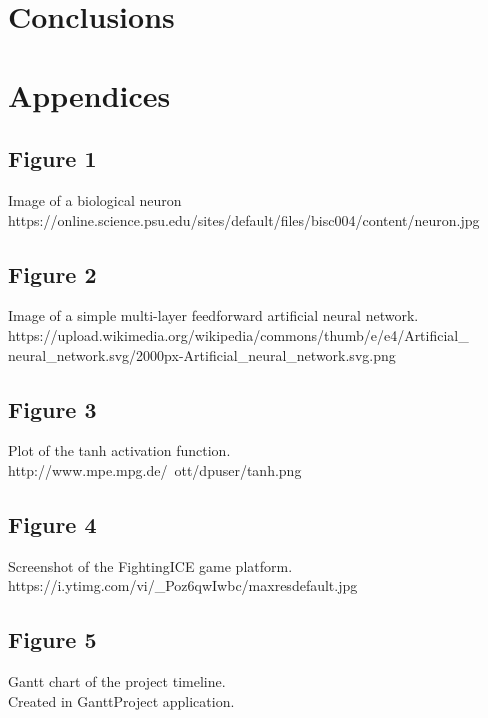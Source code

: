 \documentclass[11pt,a4paper]{article}
\begin{document}
\section{Conclusions}
\newpage
\section{Appendices}
\subsection*{Figure 1}
Image of a biological neuron\\
https://online.science.psu.edu/sites/default/files/bisc004/content/neuron.jpg
\subsection*{Figure 2}
Image of a simple multi-layer feedforward artificial neural network.\\
 https://upload.wikimedia.org/wikipedia/commons/thumb/e/e4/Artificial\_ neural\_network.svg/2000px-Artificial\_neural\_network.svg.png
\subsection*{Figure 3}
Plot of the tanh activation function.\\
http://www.mpe.mpg.de/~ott/dpuser/tanh.png
\subsection*{Figure 4}
Screenshot of the FightingICE game platform.\\
https://i.ytimg.com/vi/\_Poz6qwIwbc/maxresdefault.jpg
\subsection*{Figure 5}
Gantt chart of the project timeline.\\
Created in GanttProject application.
\newpage
\end{document}
